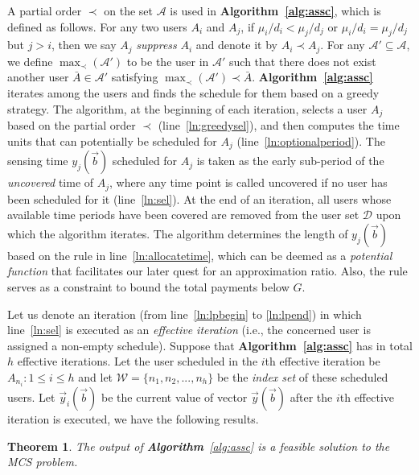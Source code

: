 \documentclass[10pt,journal,compsoc]{IEEEtran}
\newtheorem{theorem}{\textbf{Theorem}}
\begin{document}
  A partial order $\prec$ on the set $\mathcal{A}$ is used in \textbf{Algorithm~\ref{alg:assc}}, which is defined as follows. For any two users $A_i$ and $A_j$, if $\mu_i/d_i<\mu_j/d_j$ or $\mu_i/d_i=\mu_j/d_j$ but $j>i$, then we say $A_j$ \textit{suppress} $A_i$ and denote it by $A_i\prec A_j$. For any $\mathcal{A}' \subseteq \mathcal{A}$, we define $\max_{\prec}(\mathcal{A}')$ to be the user in $\mathcal{A}'$ such that there does not exist another user $\bar{A}\in \mathcal{A}'$ satisfying $\max_{\prec}(\mathcal{A}')\prec \bar{A}$. 
\textbf{Algorithm~\ref{alg:assc}} iterates among the users and finds the schedule for them based on a greedy strategy. The algorithm, at the beginning of each iteration, selects a user $A_j$ based on the partial order $\prec$ (line~\ref{ln:greedysel}), and then computes the time units that can potentially be scheduled for $A_j$ (line~\ref{ln:optionalperiod}). The sensing time $y_j(\vec{b})$ scheduled for $A_j$ is taken as the early sub-period of the \textit{uncovered} time of $A_j$, where any time point is called uncovered if no user has been scheduled for it (line~\ref{ln:sel}). At the end of an iteration, all users whose available time periods have been covered are removed from the user set $\mathcal{D}$ upon which the algorithm iterates.
The algorithm determines the length of $y_j(\vec{b})$ based on the rule in line~\ref{ln:allocatetime}, which can be deemed as a \textit{potential function} \cite{Cormen2001} that facilitates our later quest for an approximation ratio. Also, the rule serves as a constraint to bound the total payments below $G$.


  Let us denote an iteration (from line~\ref{ln:lpbegin} to \ref{ln:lpend}) in which line~\ref{ln:sel} is executed as an \textit{effective iteration} (i.e., the concerned user is assigned a non-empty schedule). Suppose that \textbf{Algorithm~\ref{alg:assc}} has in total $h$ effective iterations. Let the user scheduled in the $i$th effective iteration be $A_{n_i}: 1 \leq i\leq h$ and let $\mathcal{W}=\{n_1,n_2,...,n_h\}$ be the \textit{index set} of these scheduled users. Let $\vec{y}_i(\vec{b})$ be the current value of vector $\vec{y}(\vec{b})$ after the $i$th effective iteration is executed, we have the following results. 

  \begin{theorem}
    The output of \textbf{Algorithm}~\ref{alg:assc} is a feasible solution to the MCS problem.
    \label{thm:correctness}
  \end{theorem}
\end{document}
